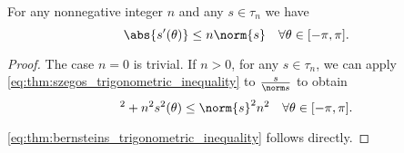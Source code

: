 \begin{corollary}\label{thm:bernsteins_trigonometric_inequality}\mcite\cite[53]{Николов2020}
  For any nonnegative integer \( n \) and any \( s \in \tau_n \) we have
  \begin{equation}\label{eq:thm:bernsteins_trigonometric_inequality}
    \abs{s'(\theta)} \leq n \norm{s} \quad\forall \theta \in [-\pi, \pi].
  \end{equation}
\end{corollary}
\begin{proof}
  The case \( n = 0 \) is trivial. If \( n > 0 \), for any \( s \in \tau_n \), we can apply \eqref{eq:thm:szegos_trigonometric_inequality} to \( \frac s {\norm s} \) to obtain
  \begin{equation}
    [s'(\theta)]^2 + n^2 s^2 (\theta) \leq \norm{s}^2 n^2 \quad\forall \theta \in [-\pi, \pi].
  \end{equation}

  \eqref{eq:thm:bernsteins_trigonometric_inequality} follows directly.
\end{proof}


